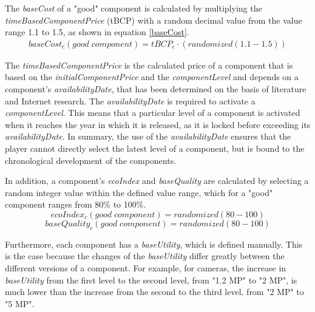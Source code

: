 The \textit{baseCost} of a "good" component is calculated by multiplying the \textit{timeBasedComponentPrice} (\gls{tBCP}) with a random decimal value from the value range 1.1 to 1.5, as shown in equation \ref{baseCost}.
\begin{equation}
\label{baseCost}
\begin{aligned}
   baseCost_{c}(good \; component) = tBCP_{c} \cdot (randomized(1.1-1.5))
\end{aligned}    
\end{equation}

The \textit{timeBasedComponentPrice} is the calculated price of a component that is based on the \textit{initialComponentPrice} and the \textit{componentLevel} and depends on a component's \textit{availabilityDate}, that has been determined on the basis of literature and Internet research. The \textit{availabilityDate} is required to activate a \textit{componentLevel}. This means that a particular level of a component is activated when it reaches the year in which it is released, as it is locked before exceeding its \textit{availabilityDate}. In summary, the use of the \textit{availabilityDate} ensures that the player cannot directly select the latest level of a component, but is bound to the chronological development of the components.

In addition, a component's \textit{ecoIndex} and \textit{baseQuality} are calculated by selecting a random integer value within the defined value range, which for a "good" component ranges from 80\% to 100\%.
\begin{equation}
    ecoIndex_{c}(good \; component) = randomized(80-100)
\end{equation}
\begin{equation}
    baseQuality_{c}(good \; component) = randomized(80-100)
\end{equation}

Furthermore, each component has a \textit{baseUtility}, which is defined manually. This is the case because the changes of the \textit{baseUtility} differ greatly between the different versions of a component. For example, for cameras, the increase in \textit{baseUtility} from the first level to the second level, from "1.2 MP" to "2 MP", is much lower than the increase from the second to the third level, from "2 MP" to "5 MP". 


